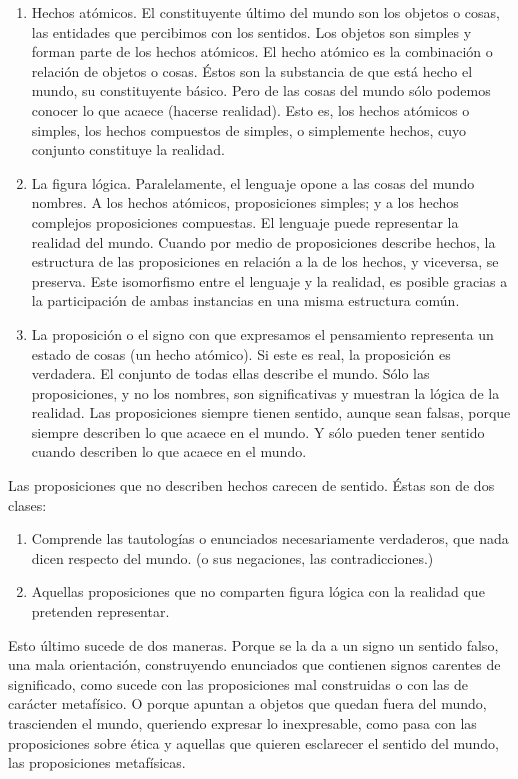 \documentclass[a4paper, 11pt, twocolumn, spanish]{article}
\begin{document}
\begin{enumerate}
\item Hechos atómicos. El constituyente último del mundo son los
objetos o cosas, las entidades que percibimos con los
sentidos. Los objetos son simples y forman parte de los hechos
atómicos. El hecho atómico es la combinación o relación de
objetos o cosas. Éstos son la substancia de que está hecho el
mundo, su constituyente básico. Pero de las cosas del mundo sólo
podemos conocer lo que acaece (hacerse realidad). Esto es, los
hechos atómicos o simples, los hechos compuestos de simples, o
simplemente hechos, cuyo conjunto constituye la realidad.
\item La figura lógica. Paralelamente, el lenguaje opone a las cosas
del mundo nombres. A los hechos atómicos, proposiciones simples;
y a los hechos complejos proposiciones compuestas. El lenguaje
puede representar la realidad del mundo. Cuando por medio de
proposiciones describe hechos, la estructura de las proposiciones
en relación a la de los hechos, y viceversa, se preserva. Este
isomorfismo entre el lenguaje y la realidad, es posible gracias a
la participación de ambas instancias en una misma estructura
común.
\item La proposición o el signo con que expresamos el pensamiento
representa un estado de cosas (un hecho atómico). Si este es
real, la proposición es verdadera. El conjunto de todas ellas
describe el mundo. Sólo las proposiciones, y no los nombres, son
significativas y muestran la lógica de la realidad. Las
proposiciones siempre tienen sentido, aunque sean falsas, porque
siempre describen lo que acaece en el mundo. Y sólo pueden tener
sentido cuando describen lo que acaece en el mundo.
\end{enumerate}

Las proposiciones que no describen hechos carecen de sentido. Éstas
son de dos clases:
\begin{enumerate}
\item Comprende las tautologías o enunciados necesariamente verdaderos,
que nada dicen respecto del mundo. (o sus negaciones, las
contradicciones.)
\item Aquellas proposiciones que no comparten figura lógica con la
realidad que pretenden representar.
\end{enumerate}

Esto último sucede de dos maneras. Porque se la da a un signo un
sentido falso, una mala orientación, construyendo enunciados que
contienen signos carentes de significado, como sucede con las
proposiciones mal construidas o con las de carácter metafísico. O
porque apuntan a objetos que quedan fuera del mundo, trascienden el
mundo, queriendo expresar lo inexpresable, como pasa con las
proposiciones sobre ética y aquellas que quieren esclarecer el sentido
del mundo, las proposiciones metafísicas.
\end{document}
